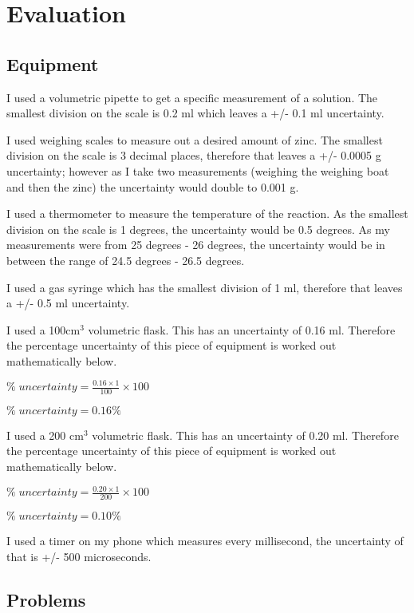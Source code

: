 \chapter {Evaluation}


\section{Equipment}

I used a volumetric pipette to get a specific measurement of a solution. The smallest division on the scale is 0.2 ml which leaves a +/- 0.1 ml uncertainty. 

I used weighing scales to measure out a desired amount of zinc. The smallest division on the scale is 3 decimal places, therefore that leaves a +/- 0.0005 g uncertainty; however as I take two measurements (weighing the weighing boat and then the zinc) the uncertainty would double to 0.001 g. 

I used a thermometer to measure the temperature of the reaction. As the smallest division on the scale is 1 degrees, the uncertainty would be 0.5 degrees. As my measurements were from 25 degrees - 26 degrees, the uncertainty would be in between the range of 24.5 degrees - 26.5 degrees.


I used a gas syringe which has the smallest division of 1 ml, therefore that leaves a +/- 0.5 ml uncertainty.

I used a 100cm$^3$ volumetric flask. This has an uncertainty of 0.16 ml. Therefore the percentage uncertainty of this piece of equipment is worked out mathematically below.

$\% \; uncertainty = \frac{0.16 \times 1}{100} \times 100$

$\% \; uncertainty = 0.16 \%$

I used a 200 cm$^3$ volumetric flask. This has an uncertainty of 0.20 ml. Therefore the percentage uncertainty of this piece of equipment is worked out mathematically below.

$\% \; uncertainty = \frac{0.20 \times 1}{200} \times 100 $

$\% \; uncertainty = 0.10 \%$

I used a timer on my phone which measures every millisecond, the uncertainty of that is +/- 500 microseconds.

\section{Problems}

